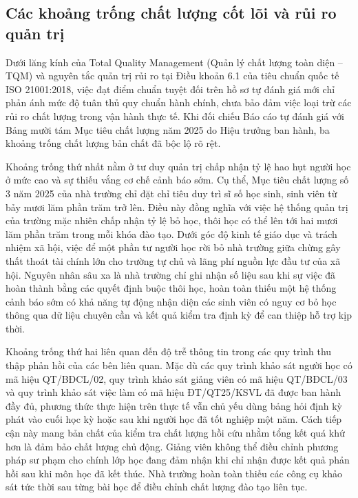 \subsection{Các khoảng trống chất lượng cốt lõi và rủi ro quản trị}

Dưới lăng kính của Total Quality Management (Quản lý chất lượng toàn diện -- TQM) và nguyên tắc quản trị rủi ro tại Điều khoản 6.1 của tiêu chuẩn quốc tế ISO 21001:2018, việc đạt điểm chuẩn tuyệt đối trên hồ sơ tự đánh giá mới chỉ phản ánh mức độ tuân thủ quy chuẩn hành chính, chưa bảo đảm việc loại trừ các rủi ro chất lượng trong vận hành thực tế. Khi đối chiếu Báo cáo tự đánh giá với Bảng mười tám Mục tiêu chất lượng năm 2025 do Hiệu trưởng ban hành, ba khoảng trống chất lượng bản chất đã bộc lộ rõ rệt.

Khoảng trống thứ nhất nằm ở tư duy quản trị chấp nhận tỷ lệ hao hụt người học ở mức cao và sự thiếu vắng cơ chế cảnh báo sớm. Cụ thể, Mục tiêu chất lượng số 3 năm 2025 của nhà trường chỉ đặt chỉ tiêu duy trì sĩ số học sinh, sinh viên từ bảy mươi lăm phần trăm trở lên. Điều này đồng nghĩa với việc hệ thống quản trị của trường mặc nhiên chấp nhận tỷ lệ bỏ học, thôi học có thể lên tới hai mươi lăm phần trăm trong mỗi khóa đào tạo. Dưới góc độ kinh tế giáo dục và trách nhiệm xã hội, việc để một phần tư người học rời bỏ nhà trường giữa chừng gây thất thoát tài chính lớn cho trường tự chủ và lãng phí nguồn lực đầu tư của xã hội. Nguyên nhân sâu xa là nhà trường chỉ ghi nhận số liệu sau khi sự việc đã hoàn thành bằng các quyết định buộc thôi học, hoàn toàn thiếu một hệ thống cảnh báo sớm có khả năng tự động nhận diện các sinh viên có nguy cơ bỏ học thông qua dữ liệu chuyên cần và kết quả kiểm tra định kỳ để can thiệp hỗ trợ kịp thời.

Khoảng trống thứ hai liên quan đến độ trễ thông tin trong các quy trình thu thập phản hồi của các bên liên quan. Mặc dù các quy trình khảo sát người học có mã hiệu QT/BĐCL/02, quy trình khảo sát giảng viên có mã hiệu QT/BĐCL/03 và quy trình khảo sát việc làm có mã hiệu ĐT/QT25/KSVL đã được ban hành đầy đủ, phương thức thực hiện trên thực tế vẫn chủ yếu dùng bảng hỏi định kỳ phát vào cuối học kỳ hoặc sau khi người học đã tốt nghiệp một năm. Cách tiếp cận này mang bản chất của kiểm tra chất lượng hồi cứu nhằm tổng kết quá khứ hơn là đảm bảo chất lượng chủ động. Giảng viên không thể điều chỉnh phương pháp sư phạm cho chính lớp học đang đảm nhận khi chỉ nhận được kết quả phản hồi sau khi môn học đã kết thúc. Nhà trường hoàn toàn thiếu các công cụ khảo sát tức thời sau từng bài học để điều chỉnh chất lượng đào tạo liên tục.

